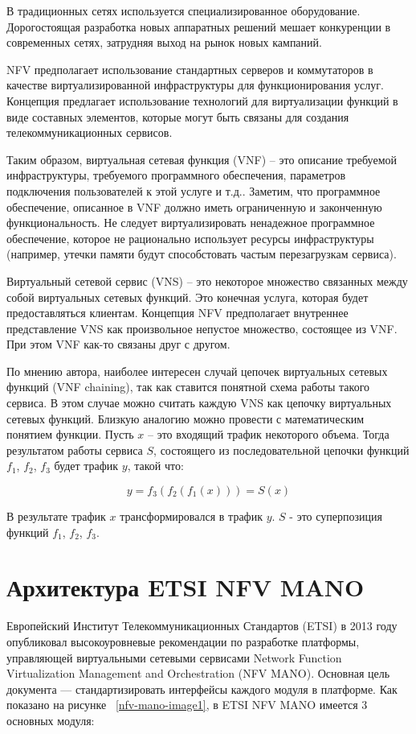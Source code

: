 \documentclass[oneside,final,14pt,a4paper]{extreport}
\begin{document}
В традиционных сетях используется специализированное оборудование. Дорогостоящая разработка новых аппаратных решений мешает конкуренции в современных сетях, затрудняя выход на рынок новых кампаний.

NFV предполагает использование стандартных серверов и коммутаторов в качестве виртуализированной инфраструктуры для функционирования услуг. Концепция предлагает использование технологий для виртуализации функций в виде составных элементов, которые могут быть связаны для создания телекоммуникационных сервисов.

Таким образом, виртуальная сетевая функция (VNF) -- это описание требуемой инфраструктуры, требуемого программного обеспечения, параметров подключения пользователей к этой услуге и т.д.. Заметим, что программное обеспечение, описанное в VNF должно иметь ограниченную и законченную функциональность. Не следует виртуализировать ненадежное программное обеспечение, которое не рационально использует ресурсы инфраструктуры (например, утечки памяти будут способстовать частым перезагрузкам сервиса).

Виртуальный сетевой сервис (VNS) -- это некоторое множество связанных между собой виртуальных сетевых функций. Это конечная услуга, которая будет предоставляться клиентам. Концепция NFV предполагает внутреннее представление VNS как произвольное непустое множество, состоящее из VNF. При этом VNF как-то связаны друг с другом.

По мнению автора, наиболее интересен случай цепочек виртуальных сетевых функций (VNF chaining), так как ставится понятной схема работы такого сервиса. В этом случае можно считать каждую VNS как цепочку виртуальных сетевых функций. Близкую аналогию можно провести с математическим понятием функции. Пусть $x$ -- это входящий трафик некоторого объема. Тогда результатом работы сервиса $S$, состоящего из последовательной цепочки функций $f_{1}$, $f_{2}$, $f_{3}$ будет трафик $y$, такой что:

\begin{equation}
	\label{eq:service_example}
	y = f_3(f_2(f_1(x))) = S(x)
\end{equation}

В результате трафик $x$ трансформировался в трафик $y$. $S$ - это суперпозиция функций $f_{1}$, $f_{2}$, $f_{3}$.


\section{Архитектура ETSI NFV MANO}
\label{sec:etsi_nfv_mano}
Европейский Институт Телекоммуникационных Стандартов (ETSI) в 2013 году опубликовал высокоуровневые рекомендации по разработке платформы, управляющей виртуальными сетевыми сервисами Network Function Virtualization Management and Orchestration (NFV MANO). Основная цель документа --- стандартизировать интерфейсы каждого модуля в платформе.\cite{nfv-mano-state1} Как показано на рисунке ~\ref{nfv-mano-image1}, в ETSI NFV MANO имеется 3 основных модуля:
\end{document}
